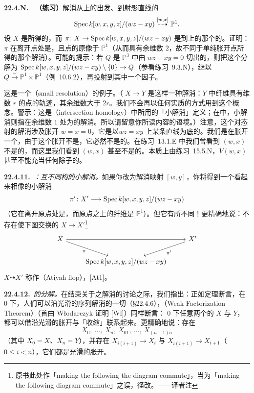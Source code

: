 \textbf{22.4.N.}\ \hard\ \textbf{（练习）}\quad 解消从\trQuadricSurface{}上的\trCone{}出发、到射影直线的\trRationalMap
\[
\operatorname{Spec} k[w,x,y,z]/(wz-xy)\mathrel{\overset{[w,x]}{\dashrightarrow}}\mathbb{P}^1.
\]
设 $X$ 是所得的\trVariety，而 $\pi\colon X\to\operatorname{Spec} k[w,x,y,z]/(wz-xy)$ 是到\trQuadricSurface{}上的那个\trCone{}的\trProjection。证明：$\pi$ 在离开\trCone{}点处是\trIsomorphism，且\trCone{}点的原像\trIsomorphic{}于 $\mathbb{P}^1$（从而具有余维数 $2$，故不同于单纯胀开\trCone{}点所得的那个解消）。可能的提示：若 $Q$ 是 $\mathbb{P}^3$ 中由 $wz-xy=0$ 切出的\trQuadricSurface，则把这个\trRationalMap{}分解为 $\operatorname{Spec} k[w,x,y,z]/(wz-xy)\setminus\{0\}\to Q$（参看\mbox{练习~9.3.N}），继以\trIsomorphism{} $Q\overset{\sim}{\longrightarrow}\mathbb{P}^1\times\mathbb{P}^1$（\mbox{例~10.6.2}），再投射到其中一个因子。

这是一个\textbf{\trSmallResolution}（small resolution）的例子。（\trSmallResolution{} $X\to Y$ 是这样一种解消：$Y$ 中纤维具有维数 $r$ 的点的轨迹，其余维数大于 $2r$。我们不会再以任何实质的方式用到这个概念。警示：这是\trIntersectionHomology（intersection homology）中所用的「小解消」定义；在\trMinimalModelProgram{}中，小解消则指在余维数 $1$ 处为\trIsomorphism{}的解消。所以请留意你所读内容的语境。）注意，这个对态射的解消涉及胀开\trBaseLocus{} $w=x=0$，它是以\trQuadricSurface $wz=xy$ 上某条直线为底的\trCone。我们是在胀开一个\trEffective\trWeilDivisor，由于这个胀开不是\trIsomorphism，它必然不是\trCartier{}的。在\mbox{练习~13.1.E} 中我们曾看到 $(w,x)$ 不是\trPrincipal{}的，而这里我们看到 $(w,x)$ 甚至不是\trLocallyPrincipal{}的。本质上由\mbox{练习~15.5.N}，$V(w,x)$ 甚至不能充当任何\trLocallyPrincipal{}除子的\trSupport。

\textbf{22.4.11.}\ \emph{\trhRemark{}：互不同构的小解消。}\quad 如果你改为解消映射 $[w,y]$，你将得到一个看起来相像的小解消
\[
\pi'\colon X'\longrightarrow\operatorname{Spec} k[w,x,y,z]/(wz-xy)
\]
（它在离开原点处是\trIsomorphism，而原点之上的纤维是 $\mathbb{P}^1$）。但它有所不同！更精确地说：不存在使下图交换的\trMorphism{} $X\to X'$\footnote{原书此处作「making the following the diagram commute」，当为「making the following diagram commute」之误，径改。——译者注}
\[
\begin{tikzcd}
X \ar[rr] \ar[dr,"\pi"'] && X' \ar[dl,"\pi'"] \\
& \Spec k[w,x,y,z]/(wz-xy) &
\end{tikzcd}
\]
\trBirational\trRationalMap{} $X\dashrightarrow X'$ 称作\textbf{\trAtiyahFlop}（Atiyah flop），[At1]。

\textbf{22.4.12.}\ \emph{\trBirational\trRationalMap{}的分解。}\quad 在结束关于\trRationalMap{}之解消的讨论之际，我们指出：正如\trHironaka{}定理断言，在\trCharacteristic{} $0$ 下，人们可以沿光滑\trSubvariety{}的\trBlowup{}序列解消\trVariety{}的一切\trSingularPoint（\S22.4.6），\emph{\trWeakFactorizationTheorem}（Weak Factorization Theorem）（首由 Włodarczyk 证明 [Wl]）同样断言：\trCharacteristic{} $0$ 下任意两个\trBirational{}的\trVariety{} $X$ 与 $Y$，都可以借沿光滑\trSubvariety{}的胀开与「收缩」联系起来。更精确地说：存在\trVariety
\[
X_0,\ \dots,\ X_n,\ X_{01},\ \dots,\ X_{(n-1)n}
\]
（其中 $X_0=X$、$X_n=Y$），并存在\trMorphism{} $X_{i(i+1)}\to X_i$ 与 $X_{i(i+1)}\to X_{i+1}$（$0\le i<n$），它们都是光滑\trSubvariety{}的胀开。

